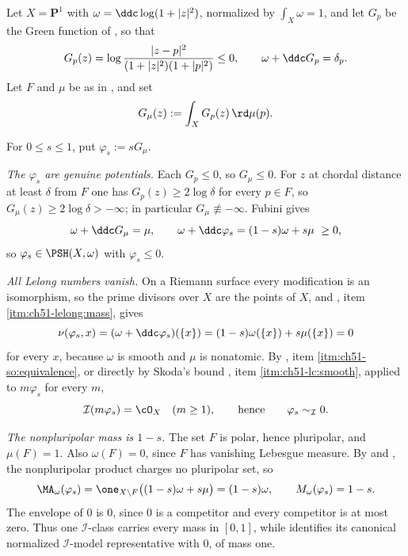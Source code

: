 \begin{example}
\label{ex:ch51-cantor}
Let \(X=\mathbf P^1\) with \(\omega=\ddc\log(1+|z|^2)\), normalized by
\(\int_X\omega=1\), and let \(G_p\) be the Green function of
, so that
\[
 G_p(z)=\log\frac{|z-p|^2}{(1+|z|^2)(1+|p|^2)}\leq0,
 \qquad
 \omega+\ddc G_p=\delta_p .
\]
Let \(F\) and \(\mu\) be as in , and set
\[
 G_\mu(z):=\int_XG_p(z)\,\rd\mu(p).
\]

For \(0\leq s\leq1\), put \(\varphi_s:=sG_\mu\).

\emph{The \(\varphi_s\) are genuine potentials.}  Each \(G_p\leq0\), so
\(G_\mu\leq0\).  For \(z\) at chordal distance at least \(\delta\) from
\(F\) one has \(G_p(z)\geq2\log\delta\) for every \(p\in F\), so
\(G_\mu(z)\geq2\log\delta>-\infty\); in particular
\(G_\mu\not\equiv-\infty\).  Fubini gives
\[
 \omega+\ddc G_\mu=\mu ,
 \qquad
 \omega+\ddc\varphi_s=(1-s)\omega+s\mu\ \geq0,
\]
so \(\varphi_s\in\PSH(X,\omega)\) with \(\varphi_s\leq0\).

\emph{All Lelong numbers vanish.}  On a Riemann surface every
modification is an isomorphism, so the prime divisors over \(X\) are the
points of \(X\), and
, item \cref{itm:ch51-lelong:mass}, gives
\[
 \nu(\varphi_s,x)=(\omega+\ddc\varphi_s)(\{x\})
 =(1-s)\omega(\{x\})+s\mu(\{x\})=0
\]
for every \(x\), because \(\omega\) is smooth and \(\mu\) is nonatomic.
By , item
\cref{itm:ch51-so:equivalence}, or directly by Skoda's bound
, item \cref{itm:ch51-lc:smooth}, applied
to \(m\varphi_s\) for every \(m\),
\[
 \mathcal I(m\varphi_s)=\cO_X\quad(m\geq1),
 \qquad\text{hence}\qquad
 \varphi_s\sim_{\mathcal I}0 .
\]

\emph{The nonpluripolar mass is \(1-s\).}  The set \(F\) is polar,
hence pluripolar, and \(\mu(F)=1\).  Also \(\omega(F)=0\), since \(F\)
has vanishing Lebesgue measure.  By
 and
, the nonpluripolar product charges no
pluripolar set, so
\[
 \MA_\omega(\varphi_s)
 =\one_{X\setminus F}\bigl((1-s)\omega+s\mu\bigr)
 =(1-s)\omega,
 \qquad
 M_\omega(\varphi_s)=1-s .
\]
The envelope of \(0\) is \(0\), since \(0\) is a competitor and every
competitor is at most zero.  Thus one \(\mathcal I\)-class carries every
mass in \([0,1]\), while
 identifies its canonical
normalized \(\mathcal I\)-model representative with \(0\), of mass one.


\end{example}
